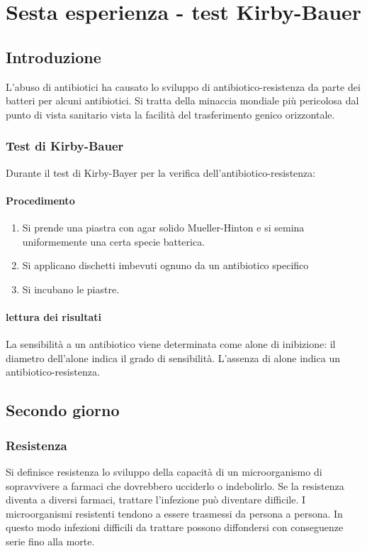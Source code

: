 \section{Sesta esperienza - test Kirby-Bauer}

	\subsection{Introduzione}
	L'abuso di antibiotici ha causato lo sviluppo di antibiotico-resistenza da parte dei batteri per alcuni antibiotici.
	Si tratta della minaccia mondiale pi\`u pericolosa dal punto di vista sanitario vista la facilit\`a del trasferimento genico orizzontale.
	
		\subsubsection{Test di Kirby-Bauer}
		Durante il test di Kirby-Bayer per la verifica dell'antibiotico-resistenza:
			
			\paragraph{Procedimento}
			\begin{enumerate}
				\item Si prende una piastra con agar solido Mueller-Hinton e si semina uniformemente una certa specie batterica.
				\item Si applicano dischetti imbevuti ognuno da un antibiotico specifico
				\item Si incubano le piastre.
			\end{enumerate}

			\paragraph{lettura dei risultati}
			La sensibilit\`a a un antibiotico viene determinata come alone di inibizione: il diametro dell'alone indica il grado di sensibilit\`a.
			L'assenza di alone indica un antibiotico-resistenza.
	\subsection{Secondo giorno}

		\subsubsection{Resistenza}
		Si definisce resistenza lo sviluppo della capacit\`a di un microorganismo di sopravvivere a farmaci che dovrebbero ucciderlo o indebolirlo.
		Se la resistenza diventa a diversi farmaci, trattare l'infezione pu\`o diventare difficile.
		I microorganismi resistenti tendono a essere trasmessi da persona a persona.
		In questo modo infezioni difficili da trattare possono diffondersi con conseguenze serie fino alla morte.

